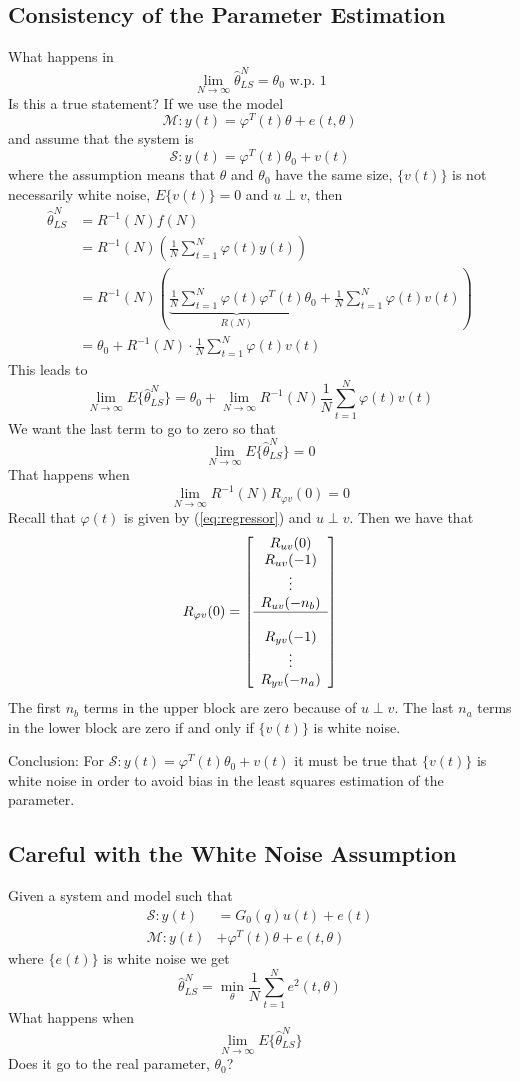 \documentclass[lecture,12pt,]{pcms-l}
\theoremstyle{example}
\newcommand{\thn}{\hat{\theta}_{LS}^N}
\begin{document}
\subsection{Consistency of the Parameter Estimation}
What happens in
$$\lim_{N\to\infty} \thn  = \theta_0 \text{ w.p. } 1$$
Is this a true statement? If we use the model
$$\mathcal{M}: y(t) = \varphi^T(t)\theta + e(t,\theta)$$
and assume that the system is
$$\mathcal{S}: y(t) = \varphi^T(t)\theta_0 + v(t)$$
where the assumption means that $\theta$ and $\theta_0$ have the same size, $\{v(t)\}$ is not necessarily white noise, $E\{v(t)\} = 0$ and $u\perp v$, then
\begin{align}
\label{eq:thn}
\thn &= R^{-1}(N)f(N) \nonumber \\
&= R^{-1}(N)\left(\frac{1}{N}\sum_{t=1}^N\varphi(t)y(t)\right) \nonumber \\
&= R^{-1}(N)\left( \underbrace{\frac{1}{N}\sum_{t=1}^N\varphi(t)\varphi^T(t)}_{R(N)}\theta_0+\frac{1}{N}\sum_{t=1}^N\varphi(t)v(t)\right) \nonumber\\
&= \theta_0 + R^{-1}(N)\cdot \frac{1}{N}\sum_{t=1}^N\varphi(t)v(t)
\end{align}
This leads to
$$\lim_{N\to\infty} E\{\thn\} = \theta_0 + \lim_{N\to\infty}R^{-1}(N)\frac{1}{N}\sum_{t=1}^N\varphi(t)v(t)$$
We want the last term to go to zero so that
$$\lim_{N\to\infty} E\{\thn\} = 0$$
That happens when
$$\lim_{N\to\infty} R^{-1}(N)R_{\varphi v}(0) = 0$$
Recall that $\varphi(t)$ is given by (\ref{eq:regressor}) and $u\perp v$. Then we have that
$$R_{\varphi v}(0) = \left[\begin{array}{c} R_{uv}(0) \\ R_{uv}(-1) \\ \vdots \\ R_{uv}(-n_b) \\ \hline \\ R_{yv}(-1) \\ \vdots \\ R_{yv}(-n_a) \end{array}\right]$$
The first $n_b$ terms in the upper block are zero because of $u\perp v$. The last $n_a$ terms in the lower block are zero if and only if $\{v(t)\}$ is white noise.

Conclusion: For $\mathcal{S}: y(t) = \varphi^T(t)\theta_0 + v(t)$ it must be true that $\{v(t)\}$ is white noise in order to avoid bias in the least squares estimation of the parameter.

\subsection{Careful with the White Noise Assumption}
Given a system and model such that
\begin{align*}
\mathcal{S}: y(t) &= G_0(q)u(t) + e(t) \\
\mathcal{M}: y(t) &+ \varphi^T(t)\theta + e(t,\theta)
\end{align*}
where $\{e(t)\}$ is white noise we get
$$\thn = \min_\theta \frac{1}{N}\sum_{t=1}^N e^2(t,\theta)$$
What happens when
$$\lim_{N\to\infty} E\{\thn\}$$
Does it go to the real parameter, $\theta_0$?
\end{document}
